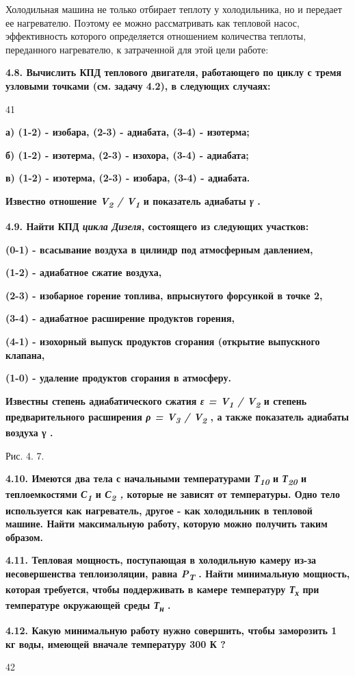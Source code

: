 
Холодильная машина не только отбирает теплоту у холодильника, но и
передает ее нагревателю. Поэтому ее можно рассматривать как тепловой
насос, эффективность которого определяется отношением количества
теплоты, переданного нагревателю, к затраченной для этой цели работе:


\textbf{4.8. Вычислить КПД теплового двигателя, работающего по циклу с
тремя узловыми точками (см. задачу 4.2), в следующих случаях:}

41

\textbf{а) (1-2) - изобара, (2-3) - адиабата, (3-4) - изотерма;}

\textbf{б) (1-2) - изотерма, (2-3) - изохора, (3-4) - адиабата;}

\textbf{в) (1-2) - изотерма, (2-3) - изобара, (3-4) - адиабата.}

\textbf{Известно отношение \emph{V\textsubscript{2} /
V\textsubscript{1}} и показатель адиабаты \emph{γ} .}

\textbf{4.9. Найти КПД \emph{цикла Дизеля}, состоящего из следующих
участков:}

\textbf{(0-1) - всасывание воздуха в цилиндр под атмосферным давлением,}

\textbf{(1-2) - адиабатное сжатие воздуха,}

\textbf{(2-3) - изобарное горение топлива, впрыснутого форсункой в точке
2,}

\textbf{(3-4) - адиабатное расширение продуктов горения,}

\textbf{(4-1) - изохорный выпуск продуктов сгорания (открытие выпускного
клапана,}

\textbf{(1-0) - удаление продуктов сгорания в атмосферу.}

\textbf{Известны степень адиабатического сжатия \emph{ε =
V\textsubscript{1} / V\textsubscript{2}} и степень предварительного
расширения \emph{ρ = V\textsubscript{3} / V\textsubscript{2}} , а также
показатель адиабаты воздуха γ .}

\begin{quote}
\end{quote}

Рис. 4. 7.

\textbf{4.10. Имеются два тела с начальными температурами
\emph{Т\textsubscript{10}} и \emph{Т\textsubscript{20}} и теплоемкостями
\emph{С\textsubscript{1}} и \emph{С\textsubscript{2} ,} которые не
зависят от температуры. Одно тело используется как нагреватель, другое -
как холодильник в тепловой машине. Найти максимальную работу, которую
можно получить таким образом.}

\textbf{4.11. Тепловая мощность, поступающая в холодильную камеру из-за
несовершенства теплоизоляции, равна \emph{P\textsubscript{T}} . Найти
минимальную мощность, которая требуется, чтобы поддерживать в камере
температуру \emph{Т\textsubscript{х}} при температуре окружающей среды
\emph{Т\textsubscript{н}} .}

\textbf{4.12. Какую минимальную работу нужно совершить, чтобы заморозить
1 кг воды, имеющей вначале температуру 300 К ?}

42